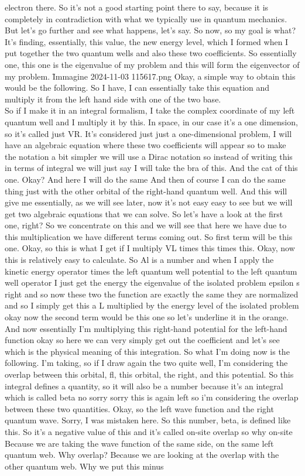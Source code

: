 electron there. So it's not a good starting point there to say, because it is completely in contradiction with what we typically use in quantum mechanics. But let's go further and see what happens, let's say. So now, so my goal is what? It's finding, essentially, this value, the new energy level, which I formed when I put together the two quantum wells and also these two coefficients. So essentially one, this one is the eigenvalue of my problem and this will form the eigenvector of my problem.
\f{Immagine 2024-11-03 115617.png}
Okay, a simple way to obtain this would be the following. So I have, I can essentially take this equation and multiply it from the left hand side with one of the two base.\\
So if I make it in an integral formalism, I take the complex coordinate of my left quantum well and I multiply it by this. In space, in our case it's a one dimension, so it's called just VR. It's considered just just a one-dimensional problem, I will have an algebraic equation where these two coefficients will appear so to make the notation a bit simpler we will use a Dirac notation so instead of writing this in terms of integral we will just say I will take the bra of this. And the cat of this one. Okay? And here I will do the same And then of course I can do the same thing just with the other orbital of the right-hand quantum well. And this will give me essentially, as we will see later, now it's not easy easy to see but we will get two algebraic equations that we can solve. So let's have a look at the first one, right? So we concentrate on this and we will see that here we have due to this multiplication we have different terms coming out. So first term will be this one. Okay, so this is what I get if I multiply VL times this times this. Okay, now this is relatively easy to calculate. So Al is a number and when I apply the kinetic energy operator times the left quantum well potential to the left quantum well operator I just get the energy the eigenvalue of the isolated problem epsilon s right and so now these two the function are exactly the same they are normalized and so I simply get this a L multiplied by the energy level of the isolated problem okay now the second term would be this one so let's underline it in the orange. And now essentially I'm multiplying this right-hand potential for the left-hand function okay so here we can very simply get out the coefficient and let's see which is the physical meaning of this integration. So what I'm doing now is the following. I'm taking, so if I draw again the two quite well, I'm considering the overlap between this orbital, fl, this orbital, the right, and this potential. So this integral defines a quantity, so it will also be a number because it's an integral which is called beta no sorry sorry this is again left so i'm considering the overlap between these two quantities. Okay, so the left wave function and the right quantum wave. Sorry, I was mistaken here. So this number, beta, is defined like this. So it's a negative value of this and it's called on-site overlap so why on-site Because we are taking the wave function of the same side, on the same left quantum web. Why overlap? Because we are looking at the overlap with the other quantum web. Why we put this minus 